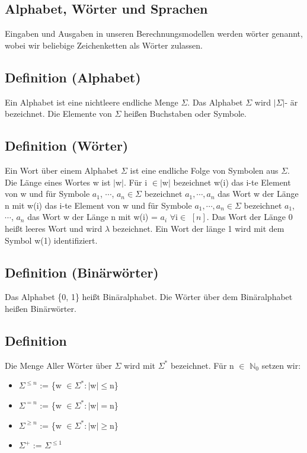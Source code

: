 \documentclass[a4paper,11pt]{article}
\begin{document}
\subsection{Alphabet, Wörter und Sprachen}
Eingaben und Ausgaben in unseren Berechnungsmodellen werden wörter genannt, wobei wir beliebige Zeichenketten als Wörter zulassen.

\subsection{Definition (Alphabet)}
Ein Alphabet ist eine nichtleere endliche Menge $\Sigma$. Das Alphabet $\Sigma$ wird $\lvert \Sigma \rvert$- är bezeichnet. Die Elemente von $\Sigma$ heißen Buchstaben oder Symbole.

\subsection{Definition (Wörter)}
Ein Wort über einem Alphabet $\Sigma$ ist eine endliche Folge von Symbolen aus $\Sigma$. Die Länge eines Wortes w ist $\lvert$w$\rvert$. Für i $\in\lvert$w$\rvert$ bezeichnet w(i) das i-te Element von w und für Symbole $a_{1}$, $\cdots$, $a_{n} \in \Sigma$ bezeichnet $a_{1}, \cdots, a_{n}$ das Wort w der Länge n mit w(i) das i-te Element von w und für Symbole $a_{1}, \cdots, a_{n} \in \Sigma$ bezeichnet $a_{1}$, $\cdots$, $a_{n}$ das Wort w der Länge n mit w(i) = $a_{i}$ $\forall$i$\in$ \([n]\). Das Wort der Länge 0 heißt leeres Wort und wird $\lambda$ bezeichnet. Ein Wort der länge 1 wird mit dem Symbol w(1) identifiziert.

\subsection{Definition (Binärwörter)}
Das Alphabet \{0, 1\} heißt Binäralphabet. Die Wörter über dem Binäralphabet heißen Binärwörter.

\subsection{Definition}
Die Menge Aller Wörter über $\Sigma$ wird mit $\Sigma^{*}$ bezeichnet. Für n $\in$ $\mathbb{N}_{0}$ setzen wir:
\begin{itemize}
    \item[] $\Sigma^{\leq n}$ := \{w $\in \Sigma^{*} : \lvert$w$\rvert \leq $n\}
    \item[] $\Sigma^{=n}$ := \{w $\in \Sigma^{*} : \lvert$w$\rvert = $n\}
    \item[] $\Sigma^{\geq n}$ := \{w $\in \Sigma^{*} : \lvert$w$\rvert \geq $n\}
    \item[] $\Sigma^{+}$ := $\Sigma^{\leq 1}$
\end{itemize}
\end{document}
